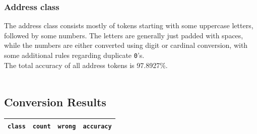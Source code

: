 \documentclass[a4paper, 9pt]{extarticle}
\newcommand{\code}{\texttt}
\begin{document}
\subsubsection{Address class}
The address class consists mostly of tokens starting with some uppercase letters, followed by some numbers. The letters are generally just padded with spaces, while the numbers are either converted using digit or cardinal conversion, with some additional rules regarding duplicate \code{0}'s.\\
The total accuracy of all address tokens is 97.8927\%.
\\\\
\begin{minipage}[t]{0.52\textwidth}
\subsection{Conversion Results}
\begin{tabular}{l|r|r|r}
\code{class}&\code{count}&\code{wrong}&\code{accuracy}\\ \hline  

\end{tabular}
\end{minipage}
\end{document}
